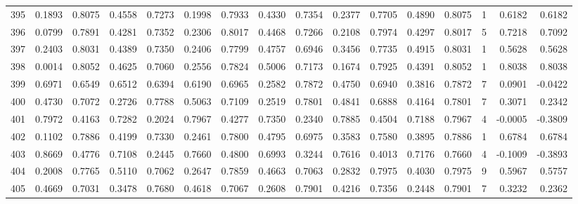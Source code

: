 \begin{tabular}{lrrrrrrrrrrrrrrr}
395 &      0.1893 &  0.8075 &  0.4558 &  0.7273 &  0.1998 &  0.7933 &  0.4330 &  0.7354 &  0.2377 &  0.7705 &   0.4890 &     0.8075 &      1 &                    0.6182 &                     0.6182 \\
396 &      0.0799 &  0.7891 &  0.4281 &  0.7352 &  0.2306 &  0.8017 &  0.4468 &  0.7266 &  0.2108 &  0.7974 &   0.4297 &     0.8017 &      5 &                    0.7218 &                     0.7092 \\
397 &      0.2403 &  0.8031 &  0.4389 &  0.7350 &  0.2406 &  0.7799 &  0.4757 &  0.6946 &  0.3456 &  0.7735 &   0.4915 &     0.8031 &      1 &                    0.5628 &                     0.5628 \\
398 &      0.0014 &  0.8052 &  0.4625 &  0.7060 &  0.2556 &  0.7824 &  0.5006 &  0.7173 &  0.1674 &  0.7925 &   0.4391 &     0.8052 &      1 &                    0.8038 &                     0.8038 \\
399 &      0.6971 &  0.6549 &  0.6512 &  0.6394 &  0.6190 &  0.6965 &  0.2582 &  0.7872 &  0.4750 &  0.6940 &   0.3816 &     0.7872 &      7 &                    0.0901 &                    -0.0422 \\
400 &      0.4730 &  0.7072 &  0.2726 &  0.7788 &  0.5063 &  0.7109 &  0.2519 &  0.7801 &  0.4841 &  0.6888 &   0.4164 &     0.7801 &      7 &                    0.3071 &                     0.2342 \\
401 &      0.7972 &  0.4163 &  0.7282 &  0.2024 &  0.7967 &  0.4277 &  0.7350 &  0.2340 &  0.7885 &  0.4504 &   0.7188 &     0.7967 &      4 &                   -0.0005 &                    -0.3809 \\
402 &      0.1102 &  0.7886 &  0.4199 &  0.7330 &  0.2461 &  0.7800 &  0.4795 &  0.6975 &  0.3583 &  0.7580 &   0.3895 &     0.7886 &      1 &                    0.6784 &                     0.6784 \\
403 &      0.8669 &  0.4776 &  0.7108 &  0.2445 &  0.7660 &  0.4800 &  0.6993 &  0.3244 &  0.7616 &  0.4013 &   0.7176 &     0.7660 &      4 &                   -0.1009 &                    -0.3893 \\
404 &      0.2008 &  0.7765 &  0.5110 &  0.7062 &  0.2647 &  0.7859 &  0.4663 &  0.7063 &  0.2832 &  0.7975 &   0.4030 &     0.7975 &      9 &                    0.5967 &                     0.5757 \\
405 &      0.4669 &  0.7031 &  0.3478 &  0.7680 &  0.4618 &  0.7067 &  0.2608 &  0.7901 &  0.4216 &  0.7356 &   0.2448 &     0.7901 &      7 &                    0.3232 &                     0.2362 \\

\end{tabular}
